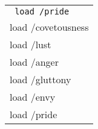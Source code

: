 {\tt 
  \begin{tabular}{|l|}
    \hline \tt
    load /pride        \\
    load /covetousness \\
    load /lust         \\
    load /anger        \\
    load /gluttony     \\
    load /envy         \\
    load /pride        \\
    \hline
  \end{tabular}
}